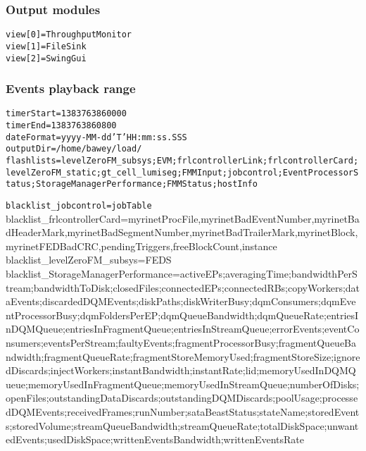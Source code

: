 \subsubsection{Output modules}
\texttt{view[0]=ThroughputMonitor} \\
\texttt{view[1]=FileSink} \\
\texttt{view[2]=SwingGui} \\


\subsubsection{Events playback range}

\texttt{timerStart=1383763860000} \\
\texttt{timerEnd=1383763860800} \\

\texttt{dateFormat=yyyy-MM-dd'T'HH:mm:ss.SSS} \\

\texttt{outputDir=/home/bawey/load/} \\

\texttt{flashlists=levelZeroFM\_subsys;EVM;frlcontrollerLink;frlcontrollerCard;levelZeroFM\_static;gt\_cell\_lumiseg;FMMInput;jobcontrol;EventProcessorStatus;StorageManagerPerformance;FMMStatus;hostInfo}

\texttt{blacklist\_jobcontrol=jobTable}
blacklist\_frlcontrollerCard=myrinetProcFile,myrinetBadEventNumber,myrinetBadHeaderMark,myrinetBadSegmentNumber,myrinetBadTrailerMark,myrinetBlock,myrinetFEDBadCRC,pendingTriggers,freeBlockCount,instance
blacklist\_levelZeroFM\_subsys=FEDS
blacklist\_StorageManagerPerformance=activeEPs;averagingTime;bandwidthPerStream;bandwidthToDisk;closedFiles;connectedEPs;connectedRBs;copyWorkers;dataEvents;discardedDQMEvents;diskPaths;diskWriterBusy;dqmConsumers;dqmEventProcessorBusy;dqmFoldersPerEP;dqmQueueBandwidth;dqmQueueRate;entriesInDQMQueue;entriesInFragmentQueue;entriesInStreamQueue;errorEvents;eventConsumers;eventsPerStream;faultyEvents;fragmentProcessorBusy;fragmentQueueBandwidth;fragmentQueueRate;fragmentStoreMemoryUsed;fragmentStoreSize;ignoredDiscards;injectWorkers;instantBandwidth;instantRate;lid;memoryUsedInDQMQueue;memoryUsedInFragmentQueue;memoryUsedInStreamQueue;numberOfDisks;openFiles;outstandingDataDiscards;outstandingDQMDiscards;poolUsage;processedDQMEvents;receivedFrames;runNumber;sataBeastStatus;stateName;storedEvents;storedVolume;streamQueueBandwidth;streamQueueRate;totalDiskSpace;unwantedEvents;usedDiskSpace;writtenEventsBandwidth;writtenEventsRate

